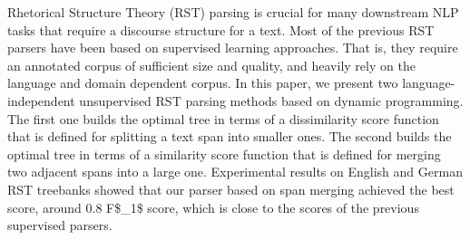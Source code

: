 Rhetorical Structure Theory (RST) parsing is crucial for many downstream NLP tasks that require a discourse structure for a text. Most of the previous RST parsers have been based on supervised learning approaches. That is, they require an annotated corpus of sufficient size and quality, and heavily rely on the language and domain dependent corpus. In this paper, we present two language-independent unsupervised RST parsing methods based on dynamic programming. The first one builds the optimal tree in terms of a dissimilarity score function that is defined for splitting a text span into smaller ones. The second builds the optimal tree in terms of a similarity score function that is defined for merging two adjacent spans into a large one. Experimental results on English and German RST treebanks showed that our parser based on span merging achieved the best score, around 0.8 F\$_1\$ score, which is close to the scores of the previous supervised parsers.